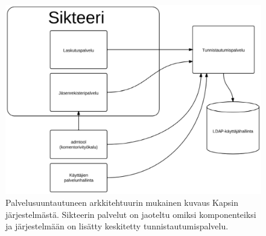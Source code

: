 \begin{figure}[ht]
\centering
\includegraphics[width=.7\textwidth]{toteutus/kapsi_uusi.eps}
\caption{Palvelusuuntautuneen arkkitehtuurin mukainen kuvaus Kapsin järjestelmästä. Sikteerin palvelut on jaoteltu omiksi komponenteiksi ja järjestelmään on lisätty keskitetty tunnistautumispalvelu.}%
\label{kapsi_uusi}
\end{figure}